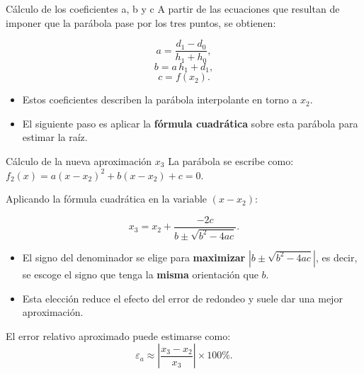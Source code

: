 \documentclass[../../main.tex]{subfiles}
\begin{document}
\begin{frame}{Cálculo de los coeficientes a, b y c}
  A partir de las ecuaciones que resultan de imponer que la parábola pase por
  los tres puntos, se obtienen:

  \[
    a = \frac{d_1 - d_0}{h_1 + h_0},
  \]
  \[
    b = a\,h_1 + d_1,
  \]
  \[
    c = f(x_2).
  \]

  \begin{itemize}
    \item Estos coeficientes describen la parábola interpolante en torno a \(x_2\).
    \item El siguiente paso es aplicar la \textbf{fórmula cuadrática}
          sobre esta parábola para estimar la raíz.
  \end{itemize}
\end{frame}

\begin{frame}{Cálculo de la nueva aproximación \(x_3\)}
  La parábola se escribe como: 
  \(
    f_2(x) = a(x - x_2)^2 + b(x - x_2) + c = 0.
  \)

  Aplicando la fórmula cuadrática en la variable \((x - x_2)\):

  \[
    x_3 = x_2 + \frac{-2c}{b \pm \sqrt{b^2 - 4ac}}.
  \]

  \begin{itemize}
    \item El signo del denominador se elige para \textbf{maximizar}
          \(|b \pm \sqrt{b^2 - 4ac}|\), es decir, se escoge el signo que tenga
          la \textbf{misma} orientación que \(b\).
    \item Esta elección reduce el efecto del error de redondeo y suele
          dar una mejor aproximación.
  \end{itemize}

  El error relativo aproximado puede estimarse como:
  \[
    \varepsilon_a \approx \left|\frac{x_3 - x_2}{x_3}\right| \times 100\%.
  \]
\end{frame}
\end{document}
